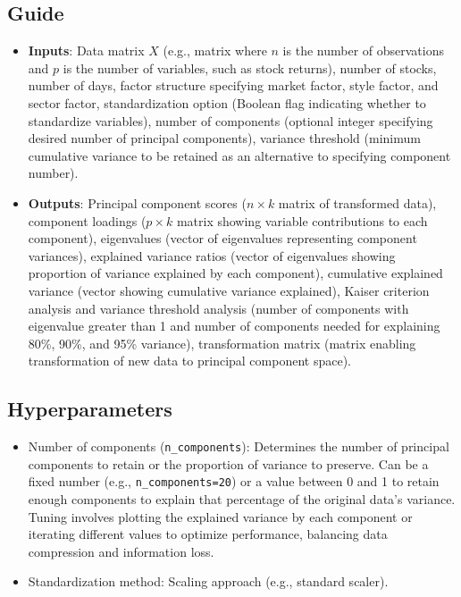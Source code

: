 \documentclass{article}
\begin{document}
\subsection{Guide}
\begin{itemize}
    \item \textbf{Inputs}: Data matrix \(X\) (e.g., matrix where \(n\) is the number of observations and \(p\) is the number of variables, such as stock returns), number of stocks, number of days, factor structure specifying market factor, style factor, and sector factor, standardization option (Boolean flag indicating whether to standardize variables), number of components (optional integer specifying desired number of principal components), variance threshold (minimum cumulative variance to be retained as an alternative to specifying component number).
    \item \textbf{Outputs}: Principal component scores (\(n \times k\) matrix of transformed data), component loadings (\(p \times k\) matrix showing variable contributions to each component), eigenvalues (vector of eigenvalues representing component variances), explained variance ratios (vector of eigenvalues showing proportion of variance explained by each component), cumulative explained variance (vector showing cumulative variance explained), Kaiser criterion analysis and variance threshold analysis (number of components with eigenvalue greater than 1 and number of components needed for explaining 80\%, 90\%, and 95\% variance), transformation matrix (matrix enabling transformation of new data to principal component space).
\end{itemize}

\subsection{Hyperparameters}
\begin{itemize}
    \item Number of components (\texttt{n\_components}): Determines the number of principal components to retain or the proportion of variance to preserve. Can be a fixed number (e.g., \texttt{n\_components=20}) or a value between 0 and 1 to retain enough components to explain that percentage of the original data’s variance. Tuning involves plotting the explained variance by each component or iterating different values to optimize performance, balancing data compression and information loss.
    \item Standardization method: Scaling approach (e.g., standard scaler).
\end{itemize}
\end{document}
